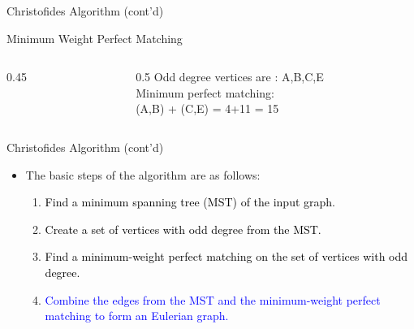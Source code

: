 \documentclass[12pt]{beamer}
\begin{document}
\begin{frame}{Christofides Algorithm (cont'd)}
    \begin{block}{Minimum Weight Perfect Matching}
    \begin{center}
    \begin{columns}
        \begin{column}{0.45\textwidth}
        \end{column}
        \begin{column}{0.5\textwidth}
        Odd degree vertices are : A,B,C,E\\
        \vspace{.2cm}
        Minimum perfect matching:\\
        (A,B) + (C,E) = 4+11 = 15\\
        \end{column}
    \end{columns}
    \end{center}
    \end{block}
\end{frame}
\begin{frame}{Christofides Algorithm (cont'd)}
    \begin{itemize}
        \item The basic steps of the algorithm are as follows:
        \begin{enumerate}
          \item \textcolor{black}{Find a minimum spanning tree (MST) of the input graph}.
         \item \textcolor{black}{Create a set of vertices with odd degree from the MST.}
         \item \textcolor{black}{Find a minimum-weight perfect matching on the set of vertices with odd degree.}
          \item \textcolor{blue} {Combine the edges from the MST and the minimum-weight perfect matching to form an Eulerian graph.}
        \end{enumerate}
    \end{itemize}
\end{frame}
\end{document}
